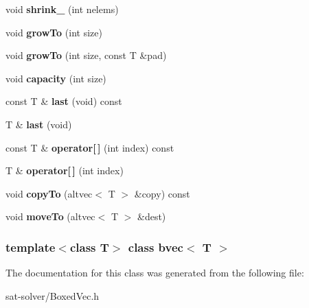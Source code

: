 \begin{DoxyCompactItemize}
\item 
\hypertarget{classbvec_afaa1f15e57166b74f9cd4754b7e24310}{void {\bfseries shrink\-\_\-} (int nelems)}\label{classbvec_afaa1f15e57166b74f9cd4754b7e24310}

\item 
\hypertarget{classbvec_a3466c2d0f0878b464567950714c7666c}{void {\bfseries grow\-To} (int size)}\label{classbvec_a3466c2d0f0878b464567950714c7666c}

\item 
\hypertarget{classbvec_af51a7824e3937ad8813b1df7c98e4233}{void {\bfseries grow\-To} (int size, const \-T \&pad)}\label{classbvec_af51a7824e3937ad8813b1df7c98e4233}

\item 
\hypertarget{classbvec_a58d27822f707ef997351ca121ed87dc3}{void {\bfseries capacity} (int size)}\label{classbvec_a58d27822f707ef997351ca121ed87dc3}

\item 
\hypertarget{classbvec_a84cb9fb3aa5db961d2fcb806a78fd4b8}{const \-T \& {\bfseries last} (void) const }\label{classbvec_a84cb9fb3aa5db961d2fcb806a78fd4b8}

\item 
\hypertarget{classbvec_ac5fb612cb7050f3fe723065babc396f5}{\-T \& {\bfseries last} (void)}\label{classbvec_ac5fb612cb7050f3fe723065babc396f5}

\item 
\hypertarget{classbvec_aa4866e84560978edf461c9a9abb21128}{const \-T \& {\bfseries operator\mbox{[}$\,$\mbox{]}} (int index) const }\label{classbvec_aa4866e84560978edf461c9a9abb21128}

\item 
\hypertarget{classbvec_a52486ad5c60b8584bfb64e3e3151c5af}{\-T \& {\bfseries operator\mbox{[}$\,$\mbox{]}} (int index)}\label{classbvec_a52486ad5c60b8584bfb64e3e3151c5af}

\item 
\hypertarget{classbvec_a1b3fb5fde0a343984e57b9ac35d3c32f}{void {\bfseries copy\-To} (altvec$<$ \-T $>$ \&copy) const }\label{classbvec_a1b3fb5fde0a343984e57b9ac35d3c32f}

\item 
\hypertarget{classbvec_a32419717f610e60d0bee7d55e320467f}{void {\bfseries move\-To} (altvec$<$ \-T $>$ \&dest)}\label{classbvec_a32419717f610e60d0bee7d55e320467f}

\end{DoxyCompactItemize}
\subsubsection*{template$<$class T$>$ class bvec$<$ T $>$}



\-The documentation for this class was generated from the following file\-:\begin{DoxyCompactItemize}
\item 
sat-\/solver/\-Boxed\-Vec.\-h\end{DoxyCompactItemize}
